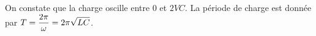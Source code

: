 \documentclass[a4paper, 11pt,reqno]{article}
\begin{document}
\begin{correction}
\begin{enumerate}
\begin{center}
\begin{minipage}[c]{0.45\linewidth}
            \end{minipage}
            \hspace*{0.5cm} \begin{minipage}[c]{0.45\linewidth}
              On constate que la charge oscille entre 0 et $2VC$. La p\'eriode de charge est donn\'ee par $T = \displaystyle \frac{2\pi}{\omega} = \displaystyle  2\pi \sqrt{LC}$.
            \end{minipage}
          \end{center}
  \end{enumerate}
\end{correction}
\end{document}
